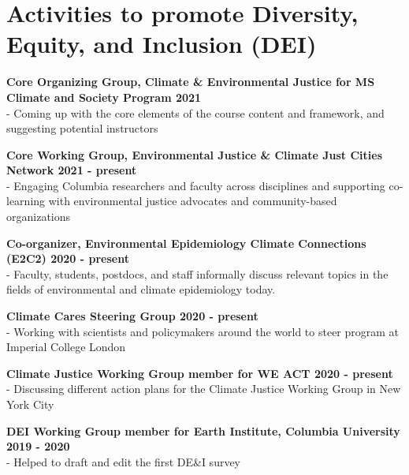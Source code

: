 \section*{Activities to promote Diversity, Equity, and Inclusion (DEI)}

\noindent \textbf{Core Organizing Group, Climate \& Environmental Justice for MS Climate and Society Program \hfill 2021}\\
- Coming up with the core elements of the course content and framework, and suggesting potential instructors \medskip

\noindent \textbf{Core Working Group, Environmental Justice \& Climate Just Cities Network \hfill 2021 - present}\\
- Engaging Columbia researchers and faculty across disciplines and supporting co-learning with environmental justice advocates and community-based organizations \medskip

\noindent \textbf{Co-organizer, Environmental Epidemiology Climate Connections (E2C2) \hfill 2020 - present}\\
- Faculty, students, postdocs, and staff informally discuss relevant topics in the fields of environmental and climate epidemiology today. \medskip

\noindent \textbf{Climate Cares Steering Group \hfill 2020 - present}\\
- Working with scientists and policymakers around the world to steer program at Imperial College London \medskip

\noindent \textbf{Climate Justice Working Group member for WE ACT \hfill 2020 - present}\\
- Discussing different action plans for the Climate Justice Working Group in New York City \medskip

\noindent \textbf{DEI Working Group member for Earth Institute, Columbia University \hfill 2019 - 2020}\\
- Helped to draft and edit the first DE\&I survey \medskip



